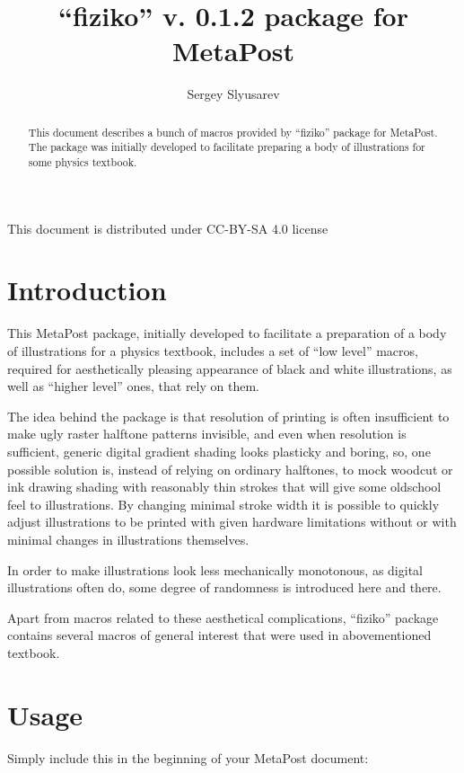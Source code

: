 \documentclass{article}
\author{Sergey Slyusarev}
\title{``fiziko'' v. 0.1.2 package for MetaPost }
\begin{document}
\maketitle

\begin{abstract}
This document describes a bunch of macros provided by ``fiziko'' package for MetaPost. The package was initially developed to facilitate preparing a body of illustrations for some physics textbook. 
\end{abstract}

\begin{centering}

This document is distributed under CC-BY-SA 4.0 license 

\cc\bysa

\end{centering}

\section{Introduction}
This MetaPost package, initially developed to facilitate a preparation of a body of illustrations for a physics textbook, includes a set of ``low level'' macros, required for aesthetically pleasing appearance of black and white illustrations, as well as ``higher level'' ones, that rely on them.

The idea behind the package is that resolution of printing is often insufficient to make ugly raster halftone patterns invisible, and even when resolution is sufficient, generic digital gradient shading looks plasticky and boring, so, one possible solution is, instead of relying on ordinary halftones, to mock woodcut or ink drawing shading with reasonably thin strokes that will give some oldschool feel to illustrations. By changing minimal stroke width it is possible to quickly adjust illustrations to be printed with given hardware limitations without or with minimal changes in illustrations themselves. 

In order to make illustrations look less mechanically monotonous, as digital illustrations often do, some degree of randomness is introduced here and there.

Apart from macros related to these aesthetical complications, ``fiziko'' package contains several macros of general interest that were used in abovementioned textbook.

\section{Usage}
Simply include this in the beginning of your MetaPost document:
\end{document}
